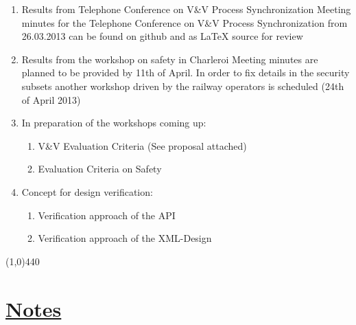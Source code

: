 \documentclass[a4paper]{article}
\begin{document}
\begin{enumerate}
\item Results from Telephone Conference on V\&V Process Synchronization 
Meeting minutes for the Telephone Conference on V\&V Process Synchronization  from 26.03.2013 can be found on github and as LaTeX source for review\\
\item Results from the workshop on safety in Charleroi
Meeting minutes are planned to be provided by 11th of April. In order to fix details in the security subsets another workshop driven by the railway operators is scheduled (24th of April 2013)
\item In preparation of the workshops coming up:
\begin{enumerate}
\item V\&V Evaluation Criteria (See proposal attached)
\item Evaluation Criteria on Safety
\end{enumerate}
\item Concept for design verification: 
\begin{enumerate}
\item Verification approach of the API
\item Verification approach of the XML-Design
\end{enumerate}
\end{enumerate}

\line(1,0){440}
\section*{\underline{Notes}}
\end{document}
